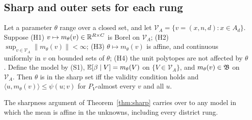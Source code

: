 \subsection{Sharp and outer sets for each rung}

\begin{theorem}\label{thm:affine}
Let a parameter $\theta$ range over a closed set, and let $\mathcal V_A=\{v=(x,n,d):x\in A_d\}$.
Suppose (H1) $v\mapsto m_\theta(v)\in\mathbb R^{R\times C}$ is Borel on $\mathcal V_A$;
(H2) $\sup_{v\in\mathcal V_A}\|m_\theta(v)\|<\infty$; (H3) $\theta\mapsto m_\theta(v)$
is affine, and continuous uniformly in $v$ on bounded sets of $\theta$; (H4) the
unit polytopes are not affected by $\theta$. Define the model by (S1),
$\mathbb E[\beta\mid V]=m_\theta(V)$ on $\{V\in\mathcal V_A\}$, and $m_\theta(v)\in\mathfrak B$ on
$\mathcal V_A$. Then $\theta$ is in the sharp set iff the validity condition holds
and $\langle u,m_\theta(v)\rangle\le\psi(u;v)$ for $P_V$-almost every $v$ and all $u$.
\end{theorem}
\begin{reading}
The sharpness argument of Theorem~\ref{thm:sharp} carries over to any model in
which the mean is affine in the unknowns, including every district rung.
\end{reading}


